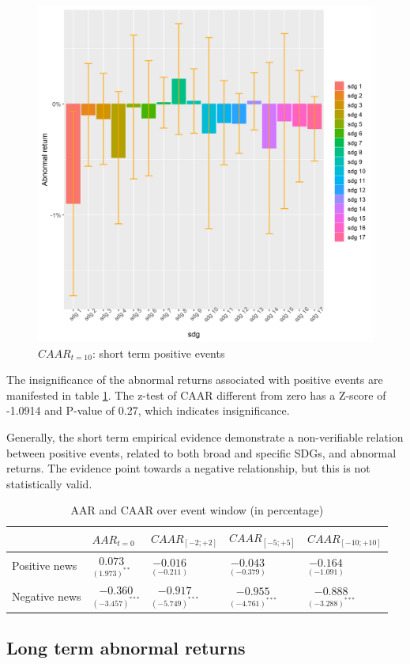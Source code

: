 \begin{figure} [H]
    \centering
    \includegraphics[scale=0.6]{Projekt/1.Figures analysis/ST_positive_sdg_bar.png}
    \caption{$CAAR_{t=10}$: short term positive events}
    \label{fig:ST_pos_bar}
\end{figure}



The insignificance of the abnormal returns associated with positive events are manifested in table \ref{tab: ST_significace}. The z-test of CAAR different from zero has a Z-score of -1.0914 and P-value of 0.27, which indicates insignificance. 

Generally, the short term empirical evidence demonstrate a non-verifiable relation between positive events, related to both broad and specific SDGs, and abnormal returns. The evidence point towards a negative relationship, but this is not statistically valid. 


\begin{table}[ht]
\centering
\begin{tabular}{lllll}
   \hline  \hline
  & $AAR_{t=0}$ & $CAAR_{[-2;+2]}$ & $CAAR_{[-5;+5]}$ & $CAAR_{[-10;+10]}$  \\
 \hline
Positive news & $\underset{(1.973)^{**}}{0.073}$  & $\underset{(-0.211)}{-0.016}$    & $\underset{(-0.379)}{-0.043}$ & $\underset{(-1.091)}{-0.164}$  \\ 
Negative news & $\underset{(-3.457)^{***}}{-0.360}$  & $\underset{(-5.749)^{***}}{-0.917}$    & $\underset{(-4.761)^{***}}{-0.955}$ & $\underset{(-3.288)^{***}}{-0.888}$  \\ 

   \hline
\end{tabular}
\caption{AAR and CAAR over event window (in percentage)} 
\label{tab: ST_significace}
\end{table}



\subsection{Long term abnormal returns}


